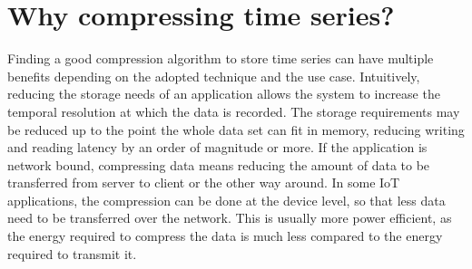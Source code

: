 \section{Why compressing time series?}
Finding a good compression algorithm to store time series can have multiple benefits depending on the adopted technique and the use case.
Intuitively, reducing the storage needs of an application allows the system to increase the temporal resolution at which the data is recorded.
The storage requirements may be reduced up to the point the whole data set can fit in memory, reducing writing and reading latency by an order of magnitude or more.
If the application is network bound, compressing data means reducing the amount of data to be transferred from server to client or the other way around.
In some IoT applications, the compression can be done at the device level, so that less data need to be transferred over the network. This is usually more power efficient, as the energy required to compress the data is much less compared to the energy required to transmit it.

